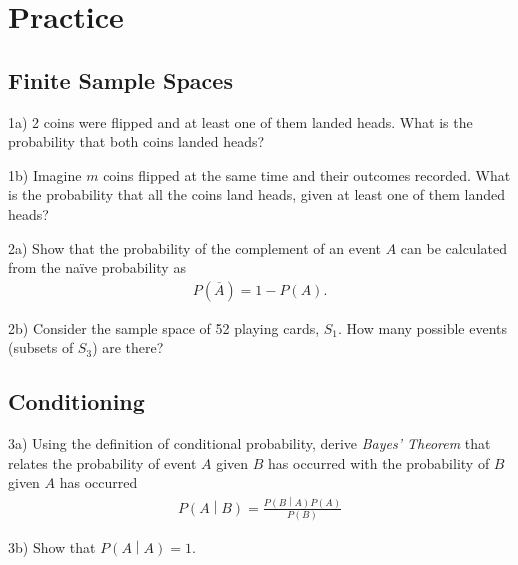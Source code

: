\documentclass[11pt,a4paper]{article}
\begin{document}
\section{Practice}

\subsection{Finite Sample Spaces}

1a) 2 coins were flipped and at least one of them landed heads. 
What is the probability that both coins landed heads?

1b) Imagine \(m\) coins flipped at the same time and their outcomes recorded. 
What is the probability that all the coins land heads, 
given at least one of them landed heads?

2a) Show that the probability of the complement of an event \(A\) 
can be calculated from the naïve probability as
\begin{align}
P\left( \overline{A} \right) = 1 - P(A).
\end{align}

2b) Consider the sample space of 52 playing cards, \(S_{1}\). 
How many possible events (subsets of \(S_{3}\)) are there?

\subsection{Conditioning}

3a) Using the definition of conditional probability, derive \emph{Bayes' Theorem} 
that relates the probability of event \(A\) given \(B\) 
has occurred with the probability of \(B\) given \(A\) has occurred
\begin{align}
P\left( A \middle| B \right) = \frac{P\left( B \middle| A \right)P(A)}{P(B)}
\end{align}

3b) Show that \(P\left( A \middle| A \right) = 1\).
\end{document}
